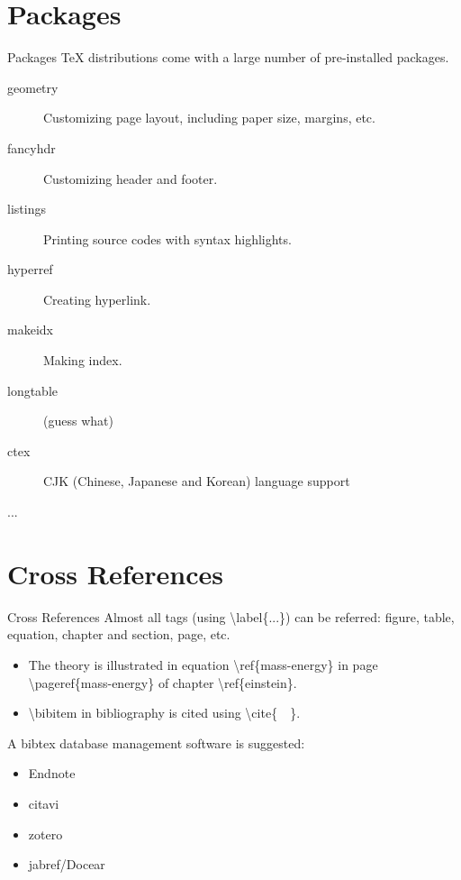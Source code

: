 \documentclass[10pt,t]{beamer}
\begin{document}
\section{Packages}
\begin{frame}{Packages}
    \TeX{} distributions come with a large number of pre-installed packages.
\begin{description}
    \item [geometry] Customizing page layout, including paper size,
        margins, etc.
    \item [fancyhdr] Customizing header and footer.
    \item [listings] Printing source codes with syntax highlights.
    \item [hyperref] Creating hyperlink.
    \item [makeidx] Making index.
    \item [longtable] (guess what)
    \item [ctex] CJK (Chinese, Japanese and Korean) language support
    \item [...]
\end{description}
\end{frame}

\section{Cross References}
\begin{frame}{Cross References}
    Almost all tags (using \textbackslash label\{...\})
    can be referred: figure, table, equation,
    chapter and section, page, etc.
\begin{itemize}
    \item The theory is illustrated in equation
        \alert{\textbackslash ref\{mass-energy\}} in page
        \alert{\textbackslash pageref\{mass-energy\}} of chapter
        \alert{\textbackslash ref\{einstein\}}.

    \item \textbackslash bibitem in bibliography is cited using
        \textbackslash cite\{\ \ \}.
\end{itemize}
A bibtex database management software is suggested:
\begin{itemize}
    \item Endnote
    \item citavi
    \item zotero
    \item jabref/Docear
\end{itemize}
\end{frame}
\end{document}
